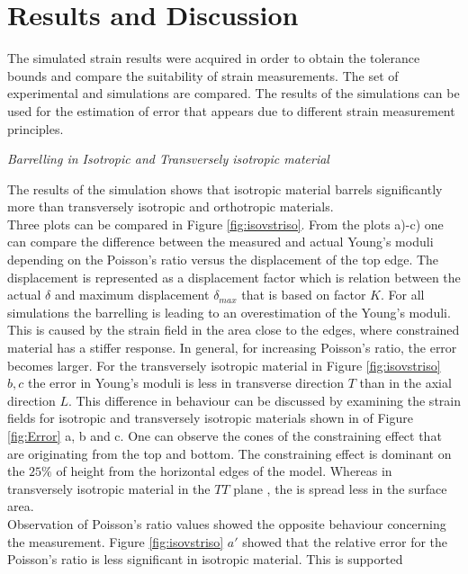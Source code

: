 \documentclass[review]{elsarticle}
\begin{document}
\section{Results and Discussion}
The simulated strain results were acquired in order to obtain the tolerance
bounds and compare the suitability of strain measurements.
The set of experimental and simulations are compared. The results of the simulations can be used for the
estimation of error that appears due to different strain measurement principles.

\begin{description}
\item{\textit{ Barrelling in Isotropic and Transversely isotropic material}}
\end{description}
The results of the simulation shows that isotropic material barrels
significantly more than transversely isotropic and orthotropic materials. \\	
Three plots can be compared in Figure \ref{fig:isovstriso}. 
From the plots a)-c) one can compare the difference between the measured and actual 
Young's moduli depending on the Poisson's ratio versus the
displacement of the top edge. The displacement is represented as a displacement
factor which is relation between the actual $\delta$ and maximum
displacement $\delta_{max}$ that is based on factor $K$. For all simulations the
barrelling is leading to an overestimation of the Young's moduli. This is caused by the strain field in the area close to the edges, where constrained material has a stiffer response.
In general, for increasing Poisson's ratio, the error becomes larger. 
For the transversely isotropic material in Figure
\ref{fig:isovstriso} $b,c$ the error in Young's moduli is less in
transverse direction $T$ than in the axial direction $L$.
This difference in behaviour can be discussed by examining the strain fields for isotropic and 
transversely isotropic materials shown in of Figure
\ref{fig:Error} a, b and c. One can
observe the cones of the constraining effect that are originating from the top
and bottom. The constraining effect is dominant on the $25\%$ of height
from the horizontal edges of the model. Whereas in transversely isotropic
material in the $TT$ plane , the is spread less in the surface area.\\
Observation of Poisson's ratio values showed the opposite behaviour concerning
the measurement.
Figure \ref{fig:isovstriso} $a'$ showed that the relative error for the
Poisson's ratio is less significant in isotropic material. This is supported
\end{document}
